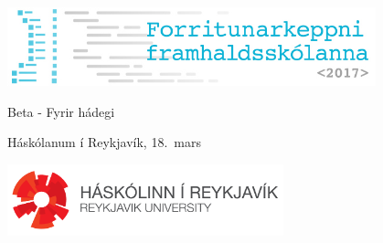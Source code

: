 \documentclass[12pt,a4paper]{problemset}
\begin{document}
\begin{titlepage}
    \centering
    \includegraphics[width=0.8\textwidth]{fklogo}\\
    \vspace{1cm}
    {\Huge Beta - Fyrir hádegi \par}
    \vspace{0.5cm}
    {\LARGE Háskólanum í Reykjavík, 18.\ mars \par}
    \vspace{2cm}
    { \Huge \tableofcontents }
    \vfill
    \includegraphics[width=0.6\textwidth]{horizontal_white.png}
\end{titlepage}

\end{document}
